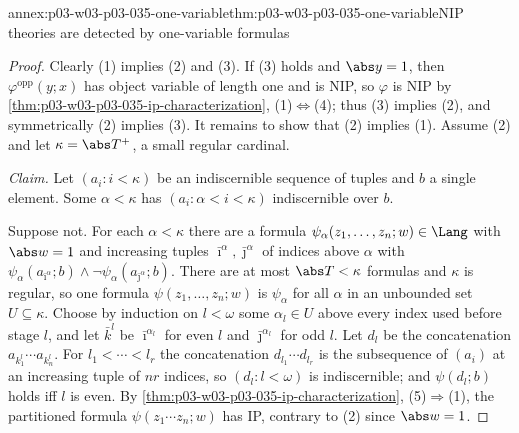 \begin{annexitem}{annex:p03-w03-p03-035-one-variable}{thm:p03-w03-p03-035-one-variable}{NIP theories are detected by one-variable formulas}
\begin{proof}
Clearly (1) implies (2) and (3).  If (3) holds and \(\abs y=1\), then
\(\varphi^{\mathrm{opp}}(y;x)\) has object variable of length one and is NIP,
so \(\varphi\) is NIP by \cref{thm:p03-w03-p03-035-ip-characterization},
(1)\(\Leftrightarrow\)(4); thus (3) implies (2), and symmetrically (2) implies
(3).  It remains to show that (2) implies (1).  Assume (2) and let
\(\kappa=\abs T^+\), a small regular cardinal.

\emph{Claim.}  Let \((a_i:i<\kappa)\) be an indiscernible sequence of tuples
and \(b\) a single element.  Some \(\alpha<\kappa\) has
\((a_i:\alpha<i<\kappa)\) indiscernible over \(b\).

Suppose not.  For each \(\alpha<\kappa\) there are a formula
\(\psi_\alpha(z_1,\ldots,z_n;w)\in\Lang\) with \(\abs w=1\) and increasing
tuples \(\bar\imath^\alpha,\bar\jmath^\alpha\) of indices above \(\alpha\) with
\(\psi_\alpha(a_{\bar\imath^\alpha};b)\wedge\neg\psi_\alpha(a_{\bar\jmath^\alpha};b)\).
There are at most \(\abs T<\kappa\) formulas and \(\kappa\) is regular, so one
formula \(\psi(z_1,\ldots,z_n;w)\) is \(\psi_\alpha\) for all \(\alpha\) in an
unbounded set \(U\subseteq\kappa\).  Choose by induction on \(l<\omega\) some
\(\alpha_l\in U\) above every index used before stage \(l\), and let
\(\bar k^l\) be \(\bar\imath^{\alpha_l}\) for even \(l\) and
\(\bar\jmath^{\alpha_l}\) for odd \(l\).  Let \(d_l\) be the concatenation
\(a_{k^l_1}\cdots a_{k^l_n}\).  For \(l_1<\cdots<l_r\) the concatenation
\(d_{l_1}\cdots d_{l_r}\) is the subsequence of \((a_i)\) at an increasing
tuple of \(nr\) indices, so \((d_l:l<\omega)\) is indiscernible; and
\(\psi(d_l;b)\) holds iff \(l\) is even.  By
\cref{thm:p03-w03-p03-035-ip-characterization}, (5)\(\Rightarrow\)(1), the
partitioned formula \(\psi(z_1\cdots z_n;w)\) has IP, contrary to (2) since
\(\abs w=1\).


\end{proof}
\end{annexitem}
